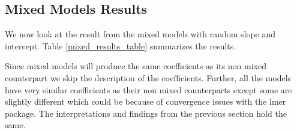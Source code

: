 \subsection{Mixed Models Results}
We now look at the result from the mixed models with random slope and intercept. Table \ref{mixed_results_table} summarizes the results.

Since mixed models will produce the same coefficients as its non mixed counterpart we skip the description of the coefficients. Further, all the models have very similar coefficients as their non mixed counterparts except some are slightly different which could be because of convergence issues with the lmer package. The interpretations and findings from the previous section hold the same.